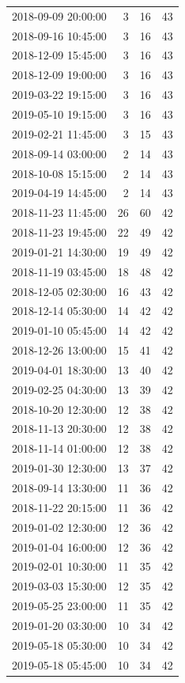 \begin{tabular}{lrrr}
2018-09-09 20:00:00 & 3 & 16 & 43 \\
2018-09-16 10:45:00 & 3 & 16 & 43 \\
2018-12-09 15:45:00 & 3 & 16 & 43 \\
2018-12-09 19:00:00 & 3 & 16 & 43 \\
2019-03-22 19:15:00 & 3 & 16 & 43 \\
2019-05-10 19:15:00 & 3 & 16 & 43 \\
2019-02-21 11:45:00 & 3 & 15 & 43 \\
2018-09-14 03:00:00 & 2 & 14 & 43 \\
2018-10-08 15:15:00 & 2 & 14 & 43 \\
2019-04-19 14:45:00 & 2 & 14 & 43 \\
2018-11-23 11:45:00 & 26 & 60 & 42 \\
2018-11-23 19:45:00 & 22 & 49 & 42 \\
2019-01-21 14:30:00 & 19 & 49 & 42 \\
2018-11-19 03:45:00 & 18 & 48 & 42 \\
2018-12-05 02:30:00 & 16 & 43 & 42 \\
2018-12-14 05:30:00 & 14 & 42 & 42 \\
2019-01-10 05:45:00 & 14 & 42 & 42 \\
2018-12-26 13:00:00 & 15 & 41 & 42 \\
2019-04-01 18:30:00 & 13 & 40 & 42 \\
2019-02-25 04:30:00 & 13 & 39 & 42 \\
2018-10-20 12:30:00 & 12 & 38 & 42 \\
2018-11-13 20:30:00 & 12 & 38 & 42 \\
2018-11-14 01:00:00 & 12 & 38 & 42 \\
2019-01-30 12:30:00 & 13 & 37 & 42 \\
2018-09-14 13:30:00 & 11 & 36 & 42 \\
2018-11-22 20:15:00 & 11 & 36 & 42 \\
2019-01-02 12:30:00 & 12 & 36 & 42 \\
2019-01-04 16:00:00 & 12 & 36 & 42 \\
2019-02-01 10:30:00 & 11 & 35 & 42 \\
2019-03-03 15:30:00 & 12 & 35 & 42 \\
2019-05-25 23:00:00 & 11 & 35 & 42 \\
2019-01-20 03:30:00 & 10 & 34 & 42 \\
2019-05-18 05:30:00 & 10 & 34 & 42 \\
2019-05-18 05:45:00 & 10 & 34 & 42 \\

\end{tabular}

